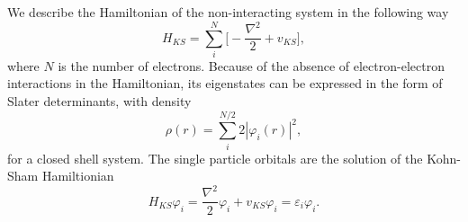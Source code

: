 \documentclass[a4paper,10pt,english]{article}%
\begin{document}
We describe the Hamiltonian of the non-interacting system in the following way
\begin{equation}
  H_{KS}=\sum_{i}^N\big[-\frac{\nabla^2}{2}+v_{KS}\big],
  \label{s2eq:Hks}
\end{equation}
where $N$ is the number of electrons. Because of the absence of 
electron-electron interactions in the Hamiltonian, its eigenstates can be 
expressed in the form of Slater determinants, with density
\begin{equation}
  \rho(r)=\sum_i^{N/2}2|\varphi_i(r)|^2,
  \label{s2eq:KSdens}
\end{equation}
for a closed shell system. The single particle orbitals are the solution of the
Kohn-Sham Hamiltionian
\begin{equation}
  H_{KS}\varphi_i=\frac{\nabla^2}{2}\varphi_i+v_{KS}\varphi_i=\varepsilon_i\varphi_i.
  \label{s2eq:kseigfe}
\end{equation}
\end{document}
